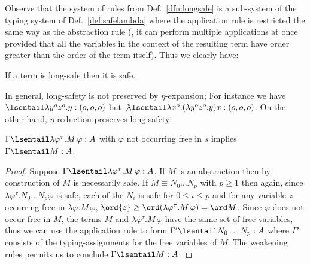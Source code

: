 Observe that the system of rules from Def.~\ref{dfn:longsafe} is a sub-system of the typing system of Def.~\ref{def:safelambda} where the application rule is  restricted the same way as the abstraction rule (\ie, it can perform multiple applications at once provided that all the variables in the context of the resulting term have order greater than the order of the term itself). Thus we clearly have:
\begin{lemma}
\label{lem:longsafe_imp_safe}
If a term is long-safe then it is safe.
\end{lemma}
\smallskip

In general, long-safety is not preserved by $\eta$-expansion; For
instance we have
$\lsentail \lambda y^o z^o . y : (o,o,o)$ but
$\not \lsentail\lambda x^o . (\lambda y^o z^o . y) x : (o,o,o)$.
On the other hand, $\eta$-reduction preserves long-safety:

\begin{lemma}
\label{lem:etared_preserve_longsafety}
  $\Gamma \lsentail \lambda \varphi^\tau . M\, \varphi :A $ with $\varphi$ not
  occurring free in $s$ implies $\Gamma \lsentail M :A$.
\end{lemma}
\begin{proof}
  Suppose $\Gamma \lsentail \lambda \varphi^\tau . M\, \varphi :A$. If $M$ is an  abstraction then by construction of $M$ is necessarily safe.  If $M \equiv N_0 \ldots N_p$ with
  $p\geq 1$ then again, since $\lambda \varphi^\tau . N_0 \ldots N_p
  \varphi$ is safe, each of the $N_i$ is safe for $0 \leq i \leq p$
  and for any variable $z$ occurring free in $\lambda \varphi . M\, \varphi$, $\ord{z} \geq \ord(\lambda \varphi^\tau . M\, \varphi) = \ord M$. Since  $\varphi$ does not occur free in $M$, the terms $M$ and $\lambda \varphi^\tau . M\, \varphi$ have the same set of free variables, thus we can use the application rule to form $\Gamma' \lsentail N_0 \ldots N_p : A$ where $\Gamma'$ consists of the typing-assignments for the free variables of $M$. The weakening rules permits us to conclude $\Gamma \lsentail M :A$.
\end{proof}

